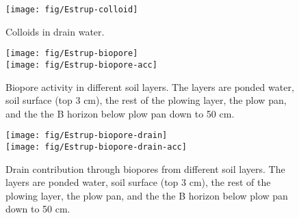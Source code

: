 \begin{figure}[htbp]
  \begin{center}
    \texttt{[image: fig/Estrup-colloid]}
  \end{center}
  \caption{Colloids in drain water.}
  \label{fig:Estrup-colloids}
\end{figure}\FloatBarrier

\begin{figure}[htbp]
  \begin{center}
    \texttt{[image: fig/Estrup-biopore]}\\
    \texttt{[image: fig/Estrup-biopore-acc]}\\
  \end{center}
  \caption{Biopore activity in different soil layers.  The layers are
    ponded water, soil surface (top 3 cm), the rest of the plowing layer,
    the plow pan, and the the B horizon below plow pan down to 50 cm.}
  \label{fig:Estrup-biopore}
\end{figure}\FloatBarrier

\begin{figure}[htbp]
  \begin{center}
    \texttt{[image: fig/Estrup-biopore-drain]}\\
    \texttt{[image: fig/Estrup-biopore-drain-acc]}
  \end{center}
  \caption{Drain contribution through biopores from different soil
    layers.  The layers are ponded water, soil surface (top 3 cm), the
    rest of the plowing layer, the plow pan, and the the B horizon
    below plow pan down to 50 cm.}
  \label{fig:Estrup-biopore-drain}
\end{figure}\FloatBarrier
